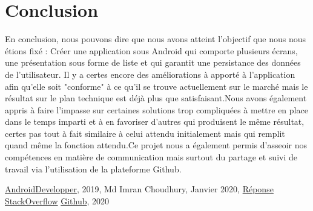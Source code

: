 \documentclass[12pt,a4paper]{report}
\begin{document}
\chapter*{Conclusion}
\begin{flushleft}
\justify
En conclusion,  nous pouvons dire que nous avons atteint l'objectif que nous nous étions fixé : Créer une application sous Android qui comporte plusieurs écrans, une présentation sous forme de liste et qui garantit une persistance des données de l'utilisateur. Il y a certes encore des améliorations à apporté à l'application afin qu'elle soit "conforme" à ce qu'il se trouve actuellement sur le marché mais le résultat sur le plan technique est déjà plus que satisfaisant.Nous avons également appris à faire l'impasse sur certaines solutions trop compliquées à mettre en place dans le temps imparti et à en favoriser d'autres qui produisent le même résultat, certes pas tout à fait similaire à celui attendu initialement mais qui remplit quand même la fonction attendu.Ce projet nous a également permis d'asseoir nos compétences en matière de communication mais surtout du partage et suivi de travail via l'utilisation de la plateforme Github\cite{3}.
\end{flushleft}
\newpage
\begin{thebibliography}{2} 
    \href{www.android.developper.com}{AndroidDevelopper}, 2019, 
    Md Imran Choudhury, Janvier 2020, \href{https://stackoverflow.com/a/16448278}{Réponse StackOverflow}
     \href{www.github.com}{Github}, 2020
    
\end{thebibliography} 
\end{document}
